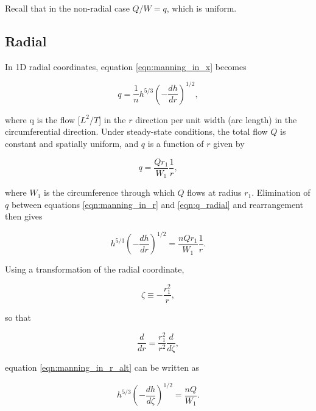 \documentclass[fleqn]{article}
\begin{document}
\noindent Recall that in the non-radial case $Q/W = q$, which is uniform.

\subsection{Radial}

In 1D radial coordinates, equation \ref{eqn:manning_in_x} becomes

\begin{equation}
  q = \frac{1}{n} h^{5/3} \left ( - \frac{dh}{dr} \right )^ {1/2} ,
  \label{eqn:manning_in_r}
\end{equation}

\noindent where q is the flow [$L^2/T$] in the $r$ direction per unit width (arc length) in the circumferential direction. Under steady-state conditions, the total flow $Q$ is constant and spatially uniform, and $q$ is a function of $r$ given by

\begin{equation}
  q = \frac{Q r_{1}}{W_{1}} \frac{1}{r} ,
  \label{eqn:q_radial}
\end{equation}

\noindent where $W_{1}$ is the circumference through which $Q$ flows at radius $r_{1}$. Elimination of $q$ between equations \ref{eqn:manning_in_r} and \ref{eqn:q_radial} and rearrangement then gives

\begin{equation}
  h^{5/3} \left ( - \frac{dh}{dr} \right )^ {1/2} = \frac{n Q r_{1}}{W_{1}} \frac{1}{r}.
  \label{eqn:manning_in_r_alt}
\end{equation}

\noindent Using a transformation of the radial coordinate,

\begin{equation}
  \zeta \equiv -\frac{r_{1}^{2}}{r} ,
  \label{eqn:zeta_defined}
\end{equation}

\noindent so that

\begin{equation}
  \frac{d}{d r} = \frac{r_{1}^{2}}{r^{2}} \frac{d}{d \zeta} ,
  \label{eqn:zeta_deriv}
\end{equation}

\noindent equation \ref{eqn:manning_in_r_alt} can be written as

\begin{equation}
  h^{5/3} \left ( - \frac{dh}{d \zeta} \right )^ {1/2} = \frac{n Q}{W_{1}}.
  \label{eqn:manning_in_zeta}
\end{equation}
\end{document}
